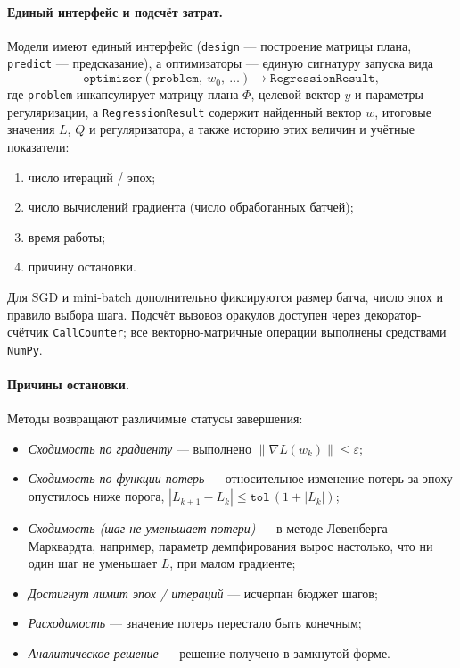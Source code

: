 \documentclass[a4paper,12pt]{article}
\newcommand{\norm}[1]{\left\|#1\right\|}
\newcommand{\grad}{\nabla}
\newcommand{\eps}{\varepsilon}
\theoremstyle{definition}
\begin{document}
\paragraph{Единый интерфейс и подсчёт затрат.}
Модели имеют единый интерфейс (\texttt{design} — построение матрицы плана, \texttt{predict} —
предсказание), а оптимизаторы — единую сигнатуру запуска вида
\[
    \texttt{optimizer}(\texttt{problem},\ w_0,\ \dots) \longrightarrow \texttt{RegressionResult},
\]
где \texttt{problem} инкапсулирует матрицу плана $\Phi$, целевой вектор $y$ и параметры
регуляризации, а \texttt{RegressionResult} содержит найденный вектор $w$, итоговые значения
$L$, $Q$ и регуляризатора, а также историю этих величин и учётные показатели:
\begin{enumerate}
    \item число итераций / эпох;
    \item число вычислений градиента (число обработанных батчей);
    \item время работы;
    \item причину остановки.
\end{enumerate}
Для SGD и mini-batch дополнительно фиксируются размер батча, число эпох и правило выбора шага.
Подсчёт вызовов оракулов доступен через декоратор-счётчик \texttt{CallCounter}; все
векторно-матричные операции выполнены средствами \texttt{NumPy}.

\paragraph{Причины остановки.}
Методы возвращают различимые статусы завершения:
\begin{itemize}
    \item \textit{Сходимость по градиенту} — выполнено $\norm{\grad L(w_k)} \leq \eps$;
    \item \textit{Сходимость по функции потерь} — относительное изменение потерь за эпоху
          опустилось ниже порога, $|L_{k+1} - L_k| \leq \texttt{tol}\,(1 + |L_k|)$;
    \item \textit{Сходимость (шаг не уменьшает потери)} — в методе Левенберга--Марквардта, например, параметр демпфирования вырос настолько, что ни один шаг не уменьшает $L$, при малом градиенте;
    \item \textit{Достигнут лимит эпох / итераций} — исчерпан бюджет шагов;
    \item \textit{Расходимость} — значение потерь перестало быть конечным;
    \item \textit{Аналитическое решение} — решение получено в замкнутой форме.
\end{itemize}
\end{document}

